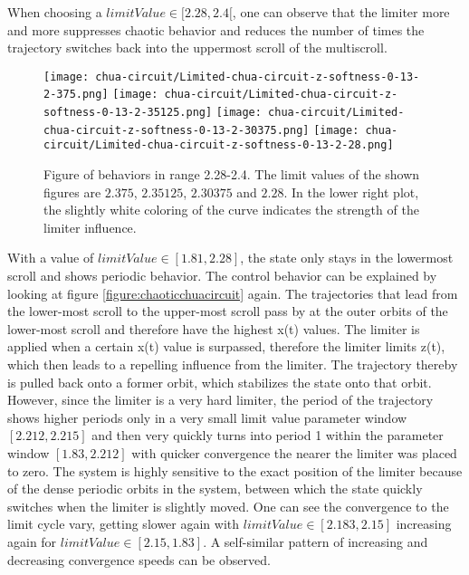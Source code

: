 \documentclass[main]{subfiles}
\begin{document}
When choosing a \(limitValue \in [2.28,2.4[\), one can observe that the limiter more and more suppresses chaotic behavior and reduces the number of times the trajectory switches back into the uppermost scroll of the multiscroll.

\begin{figure}[H]
\centering
\texttt{[image: chua-circuit/Limited-chua-circuit-z-softness-0-13-2-375.png]}
\texttt{[image: chua-circuit/Limited-chua-circuit-z-softness-0-13-2-35125.png]}
\texttt{[image: chua-circuit/Limited-chua-circuit-z-softness-0-13-2-30375.png]}
\texttt{[image: chua-circuit/Limited-chua-circuit-z-softness-0-13-2-28.png]}
\caption[Figure of behaviors in range 2.28-2.4]{Figure of behaviors in range 2.28-2.4. The limit values of the shown figures are \(2.375\), \(2.35125\), \(2.30375\) and \(2.28\). In the lower right plot, the slightly white coloring of the curve indicates the strength of the limiter influence.}
\label{figure:z-2.28-2.4-chaotictrajectories}
\end{figure}

With a value of \(limitValue \in [1.81, 2.28]\), the state only stays in the lowermost scroll and shows periodic behavior. %
%
The control behavior can be explained by looking at figure \ref{figure:chaoticchuacircuit} again. %
%
The trajectories that lead from the lower-most scroll to the upper-most scroll pass by at the outer orbits of the lower-most scroll and therefore have the highest x(t) values. %
%
The limiter is applied when a certain x(t) value is surpassed, therefore the limiter limits z(t), which then leads to a repelling influence from the limiter. %
%
The trajectory thereby is pulled back onto a former orbit, which stabilizes the state onto that orbit. %
%
However, since the limiter is a very hard limiter, the period of the trajectory shows higher periods only in a very small limit value parameter window \([2.212,2.215]\) and then very quickly turns into period 1 within the parameter window \([1.83,2.212]\) with quicker convergence the nearer the limiter was placed to zero. %
%
The system is highly sensitive to the exact position of the limiter because of the dense periodic orbits in the system, between which the state quickly switches when the limiter is slightly moved. %
%
One can see the convergence to the limit cycle vary, getting slower again with \(limitValue \in [2.183,2.15]\) increasing again for \(limitValue \in [2.15,1.83]\). %
%
A self-similar pattern of increasing and decreasing convergence speeds can be observed.
\end{document}
